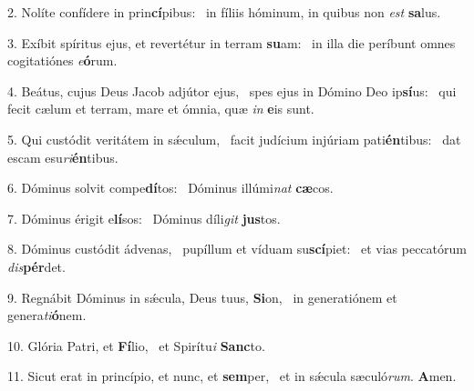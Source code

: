 2. Nolíte confídere in prin\textbf{cí}pibus: \ast\  in fíliis hóminum, in quibus non \textit{est} \textbf{sa}lus.\

3. Exíbit spíritus ejus, et revertétur in terram \textbf{su}am: \ast\  in illa die períbunt omnes cogitatiónes \textit{e}\textbf{ó}rum.\

4. Beátus, cujus Deus Jacob adjútor ejus, \dag\  spes ejus in Dómino Deo ip\textbf{sí}us: \ast\  qui fecit cælum et terram, mare et ómnia, quæ \textit{in} \textbf{e}is sunt.\

5. Qui custódit veritátem in sǽculum, \dag\  facit judícium injúriam pati\textbf{én}tibus: \ast\  dat escam esu\textit{ri}\textbf{én}tibus.\

6. Dóminus solvit compe\textbf{dí}tos: \ast\  Dóminus illúmi\textit{nat} \textbf{cæ}cos.\

7. Dóminus érigit e\textbf{lí}sos: \ast\  Dóminus díli\textit{git} \textbf{jus}tos.\

8. Dóminus custódit ádvenas, \dag\  pupíllum et víduam su\textbf{scí}piet: \ast\  et vias peccatórum \textit{dis}\textbf{pér}det.\

9. Regnábit Dóminus in sǽcula, Deus tuus, \textbf{Si}on, \ast\  in generatiónem et genera\textit{ti}\textbf{ó}nem.\

10. Glória Patri, et \textbf{Fí}lio, \ast\  et Spirítu\textit{i} \textbf{Sanc}to.\

11. Sicut erat in princípio, et nunc, et \textbf{sem}per, \ast\  et in sǽcula sæculó\textit{rum}. \textbf{A}men.\

